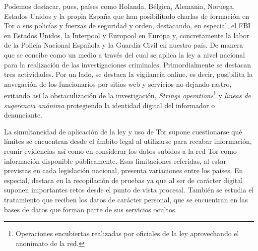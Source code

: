 \documentclass[a4paper, 11pt, titlepage]{article}
\begin{document}
        Podemos destacar, pues, países como Holanda, Bélgica, Alemania, Noruega, Estados  Unidos y la propia España que 
        han posibilitado charlas de formación en Tor a sus policías y fuerzas de seguridad y orden, destacando, en  
        especial, el FBI en Estados Unidos, la Interpool y Europool en Europa y, concretamente la labor de la Policía 
        Nacional Española y la Guardia Civil en nuestro país. De manera que se concibe como un medio a través 
        del cual se aplica la ley a nivel nacional para la realización de las investigaciones criminales. Primordialmente 
        se  destacan tres actividades. Por un lado, se destaca la vigilancia online, es decir, posibilita la  
        navegación de los funcionarios por sitios  web y servicios no dejando rastro, evitando   
        así la obstaculización  de la investigación, \emph{Strings operations}\footnote{Operaciones encubiertas 
        realizadas por oficiales de la ley aprovechando el anonimato de la red.} y \emph{líneas de sugerencia anónima} 
        protegiendo la identidad digital del informador o denunciante.

        La simultaneidad de aplicación de la ley y uso de Tor supone cuestionarse qué límites se encuentran desde el 
        ámbito legal al utilizarse para recabar información, reunir evidencias así como en considerar los datos subidos 
        a la red Tor como información disponible públicamente. Esas limitaciones referidas, al estar previstas en cada 
        legislación nacional, presenta variaciones entre los países. En especial, destaca en la recopilación de pruebas 
        ya que al ser de carácter digital suponen importantes retos desde el punto de vista procesal. También se estudia 
        el tratamiento que reciben los datos de carácter personal, que se encuentran en las bases de datos que forman 
        parte de sus servicios ocultos.
\end{document}
